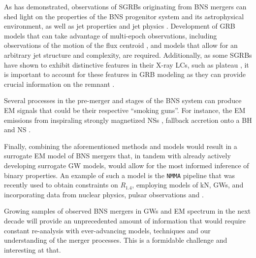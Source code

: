 As \GRB{} has demonstrated, observations of \acp{SGRB} originating from 
\ac{BNS} mergers can shed light on the properties of the \ac{BNS} 
progenitor system and its astrophysical environment, as well as jet properties 
and jet physics \citep[\eg][]{Hajela:2019mjy}. 
%
Development of \ac{GRB} models that can take advantage of multi-epoch observations, 
including observations of the motion of the flux centroid
\citep[\eg][]{Fernandez:2021xce}, and models that allow for an arbitrary 
jet structure and complexity, are required.
%
Additionally, as some \acp{SGRB} have shown to exhibit distinctive features 
in their X-ray \acp{LC}, such as plateau \citep{Kumar:2014upa}, it is important 
to account for these features in \ac{GRB} modeling as they can provide crucial 
information on the \pmerg{} remnant \citep[\eg][]{Gibson:2017dep}. 


Several processes in the pre-merger and \pmerg{} stages of the 
\ac{BNS} system can produce \ac{EM} signals that could be their respective 
``smoking guns''. 
%
For instance, the \ac{EM} emissions from inspiraling strongly magnetized \acp{NS} 
\citep[\eg][]{Beloborodov:2020ylo}, 
fallback accretion onto a \ac{BH} \citep[\eg][]{Desai:2018rbc}
and \ac{NS} \citep[\eg][]{Gibson:2017dep}.


Finally, combining the aforementioned methods and models would result in a 
surrogate \ac{EM} model of \ac{BNS} mergers that, in tandem with 
already actively developing surrogate \ac{GW} models, would allow for 
the most informed inference of binary properties. 
%
An example of such a model is the \texttt{NMMA} pipeline \citep{Dietrich:2020efo} that 
was recently used to obtain constraints on $R_{1.4}$, 
employing models of \ac{kN}, \acp{GW}, and incorporating 
data from nuclear physics, pulsar observations and \GW{}.

Growing samples of observed \ac{BNS} mergers in \acp{GW} and \ac{EM} spectrum 
in the next decade will provide an unprecedented amount of information 
that would require constant re-analysis with ever-advancing models, 
techniques and our understanding of the merger processes.
%
This is a formidable challenge and interesting at that. 
%


